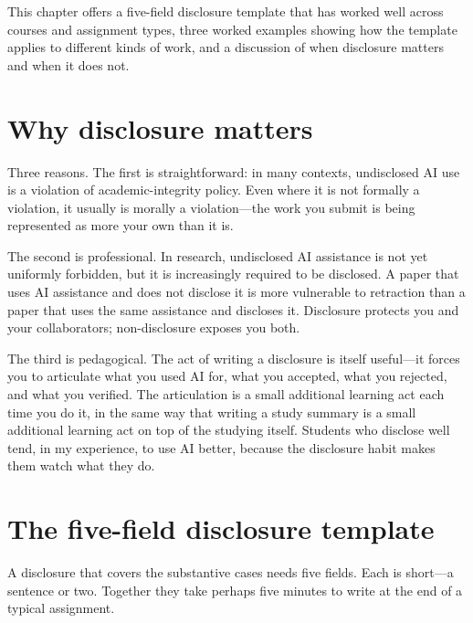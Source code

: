 \documentclass[11pt]{book}
\begin{document}
This chapter offers a five-field disclosure template that has worked well across courses and assignment types, three worked examples showing how the template applies to different kinds of work, and a discussion of when disclosure matters and when it does not.

\section{Why disclosure matters}

Three reasons. The first is straightforward: in many contexts, undisclosed AI use is a violation of academic-integrity policy. Even where it is not formally a violation, it usually is morally a violation---the work you submit is being represented as more your own than it is.

The second is professional. In research, undisclosed AI assistance is not yet uniformly forbidden, but it is increasingly required to be disclosed. A paper that uses AI assistance and does not disclose it is more vulnerable to retraction than a paper that uses the same assistance and discloses it. Disclosure protects you and your collaborators; non-disclosure exposes you both.

The third is pedagogical. The act of writing a disclosure is itself useful---it forces you to articulate what you used AI for, what you accepted, what you rejected, and what you verified. The articulation is a small additional learning act each time you do it, in the same way that writing a study summary is a small additional learning act on top of the studying itself. Students who disclose well tend, in my experience, to use AI better, because the disclosure habit makes them watch what they do.

\section{The five-field disclosure template}

A disclosure that covers the substantive cases needs five fields. Each is short---a sentence or two. Together they take perhaps five minutes to write at the end of a typical assignment.
\end{document}
